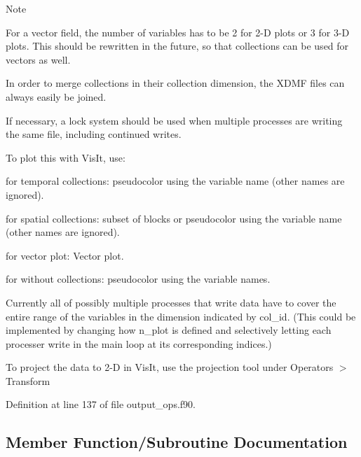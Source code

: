 \begin{DoxyNote}{Note}

\begin{DoxyEnumerate}
\item For a vector field, the number of variables has to be 2 for 2-\/D plots or 3 for 3-\/D plots. This should be rewritten in the future, so that collections can be used for vectors as well.
\item In order to merge collections in their collection dimension, the X\+D\+MF files can always easily be joined.
\item If necessary, a lock system should be used when multiple processes are writing the same file, including continued writes.
\item To plot this with Vis\+It, use\+:
\begin{DoxyItemize}
\item for temporal collections\+: pseudocolor using the variable name (other names are ignored).
\item for spatial collections\+: subset of blocks or pseudocolor using the variable name (other names are ignored).
\item for vector plot\+: Vector plot.
\item for without collections\+: pseudocolor using the variable names.
\end{DoxyItemize}
\item Currently all of possibly multiple processes that write data have to cover the entire range of the variables in the dimension indicated by {\ttfamily col\+\_\+id}. (This could be implemented by changing how n\+\_\+plot is defined and selectively letting each processer write in the main loop at its corresponding indices.)
\item To project the data to 2-\/D in Vis\+It, use the projection tool under Operators $>$ Transform 
\end{DoxyEnumerate}
\end{DoxyNote}


Definition at line 137 of file output\+\_\+ops.\+f90.



\subsection{Member Function/\+Subroutine Documentation}
\mbox{\label{interfaceoutput__ops_1_1plot__hdf5_aabeeacb6f9aab1fb21d226e6a315e3d1}} 

